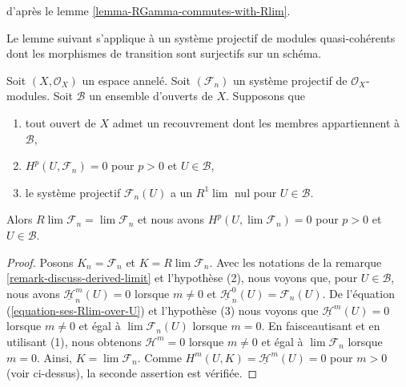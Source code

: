 {\begin{remark}
d'après le lemme \ref{lemma-RGamma-commutes-with-Rlim}.

\end{remark}

\noindent
Le lemme suivant s'applique à un système projectif de modules quasi-cohérents dont les morphismes de transition sont surjectifs sur un schéma.

\begin{lemma}

\label{lemma-inverse-limit-is-derived-limit}

Soit $(X, \mathcal{O}_X)$ un espace annelé. Soit $(\mathcal{F}_n)$ un système projectif de $\mathcal{O}_X$-modules. Soit $\mathcal{B}$ un ensemble d'ouverts de $X$. Supposons que

\begin{enumerate}

\item tout ouvert de $X$ admet un recouvrement dont les membres appartiennent à
$\mathcal{B}$,
\item  $H^p(U, \mathcal{F}_n) = 0$ pour $p > 0$ et $U \in \mathcal{B}$,
\item le système projectif $\mathcal{F}_n(U)$ a un $R^1\lim$ nul
pour $U \in \mathcal{B}$.

\end{enumerate}

Alors $R\lim \mathcal{F}_n = \lim \mathcal{F}_n$ et nous avons
$H^p(U, \lim \mathcal{F}_n) = 0$ pour $p > 0$ et $U \in \mathcal{B}$.

\end{lemma}

\begin{proof}

Posons $K_n = \mathcal{F}_n$ et $K = R\lim \mathcal{F}_n$. Avec les notations de la remarque \ref{remark-discuss-derived-limit} et l'hypothèse (2), nous voyons que, pour
$U \in \mathcal{B}$, nous avons $\underline{\mathcal{H}}_n^m(U) = 0$
lorsque $m \not = 0$ et $\underline{\mathcal{H}}_n^0(U) = \mathcal{F}_n(U)$. De l'équation (\ref{equation-ses-Rlim-over-U}) et l'hypothèse (3) nous voyons que $\underline{\mathcal{H}}^m(U) = 0$
lorsque $m \not = 0$ et égal à $\lim \mathcal{F}_n(U)$
lorsque $m = 0$. En faisceautisant et en utilisant (1), nous obtenons
$\mathcal{H}^m = 0$ lorsque $m \not = 0$ et égal à
$\lim \mathcal{F}_n$ lorsque $m = 0$. Ainsi, $K = \lim \mathcal{F}_n$. Comme $H^m(U, K) = \underline{\mathcal{H}}^m(U) = 0$ pour $m > 0$
(voir ci-dessus), la seconde assertion est vérifiée.


\end{proof}}
